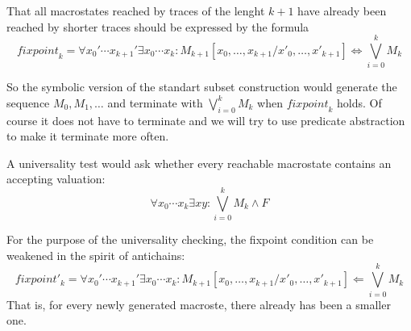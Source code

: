 \documentclass[10pt]{llncs}
\newcommand{\viz}{x}
\newcommand{\accepting}{F}
\begin{document}
That all macrostates reached by traces of the lenght $k+1$ have already been reached by shorter traces should be expressed by the formula
$$
\mathit{fixpoint}_k = \forall \viz_0'\cdots\viz_{k+1}'\exists \viz_0\cdots\viz_{k} :
M_{k+1}[\viz_0,\ldots,\viz_{k+1}/\viz'_0,\ldots,\viz'_{k+1}]
\iff 
 \bigvee_{i=0}^k M_k 
$$

So the symbolic version of the standart subset construction would generate the sequence $M_0,M_1,\ldots$ and terminate with $\bigvee_{i=0}^k M_k$ when $\mathit{fixpoint}_k$ holds.    
Of course it does not have to terminate and we will try to use predicate abstraction to make it terminate more often.

A universality test would ask whether every reachable macrostate contains an accepting valuation: 
$$
\forall \viz_0\cdots\viz_k \exists x y:  \bigvee_{i=0}^k M_k \land \accepting
$$

For the purpose of the universality checking,
the fixpoint condition can be weakened in the spirit of antichains:
$$
\mathit{fixpoint}'_k = \forall \viz_0'\cdots\viz_{k+1}'\exists \viz_0\cdots\viz_{k} :
M_{k+1}[\viz_0,\ldots,\viz_{k+1}/\viz'_0,\ldots,\viz'_{k+1}]
\Leftarrow
\bigvee_{i=0}^k M_k 
$$
That is, for every newly generated macroste, there already has been a smaller one.


%
%

\end{document}
